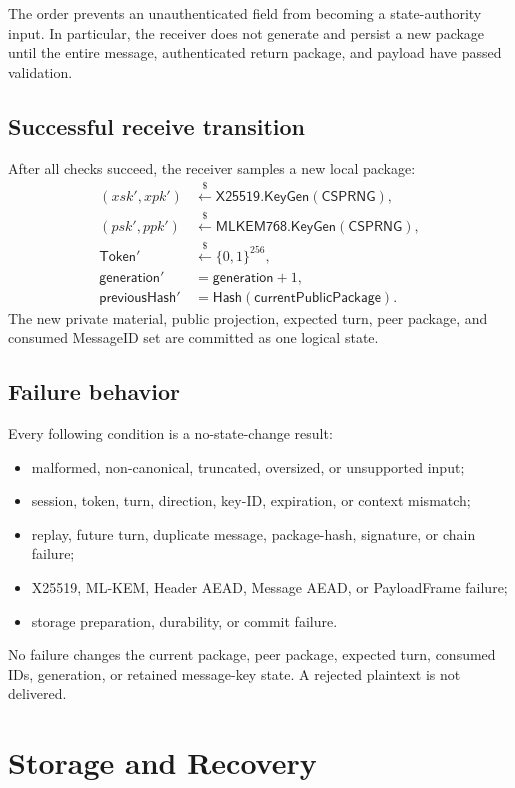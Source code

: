 \documentclass[11pt,letterpaper]{article}
\newcommand{\sample}{\xleftarrow{\$}}
\begin{document}
The order prevents an unauthenticated field from becoming a state-authority input. In
particular, the receiver does not generate and persist a new package until the entire
message, authenticated return package, and payload have passed validation.

\subsection{Successful receive transition}

After all checks succeed, the receiver samples a new local package:
\[
\begin{aligned}
  (xsk',xpk') &\sample \mathsf{X25519.KeyGen}(\mathsf{CSPRNG}),\\
  (psk',ppk') &\sample \mathsf{MLKEM768.KeyGen}(\mathsf{CSPRNG}),\\
  \mathsf{Token}' &\sample \{0,1\}^{256},\\
  \mathsf{generation}' &= \mathsf{generation}+1,\\
  \mathsf{previousHash}' &= \mathsf{Hash}(\mathsf{currentPublicPackage}).
\end{aligned}
\]
The new private material, public projection, expected turn, peer package, and consumed
MessageID set are committed as one logical state.

\subsection{Failure behavior}

Every following condition is a no-state-change result:
\begin{itemize}[leftmargin=*]
  \item malformed, non-canonical, truncated, oversized, or unsupported input;
  \item session, token, turn, direction, key-ID, expiration, or context mismatch;
  \item replay, future turn, duplicate message, package-hash, signature, or chain failure;
  \item X25519, ML-KEM, Header AEAD, Message AEAD, or PayloadFrame failure;
  \item storage preparation, durability, or commit failure.
\end{itemize}
No failure changes the current package, peer package, expected turn, consumed IDs,
generation, or retained message-key state. A rejected plaintext is not delivered.

\section{Storage and Recovery}
\label{sec:storage}
\end{document}
